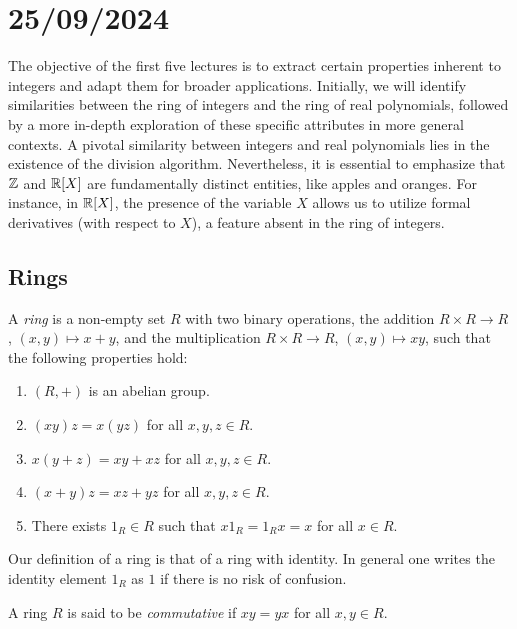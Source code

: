 \section{25/09/2024}

The objective of the first five lectures is to extract certain properties inherent to integers and adapt them for broader applications. Initially, we will identify similarities between the ring of integers and the ring of real polynomials, 
followed by a more in-depth exploration of these specific attributes in more general contexts. A pivotal similarity between integers and real polynomials lies in the existence of the division algorithm. Nevertheless, it is essential to emphasize that $\mathbb{Z}$ and $\mathbb{R}[X]$ are fundamentally distinct entities, like apples and oranges. For instance, in $\mathbb{R}[X]$, 
the presence of the variable $X$ allows us to utilize formal derivatives 
(with respect to $X$), a feature absent in the ring of integers. 

\subsection{Rings}

\begin{definition}
A \emph{ring} is a non-empty set $R$ with two binary operations, the addition
$R\times R\to R$, $(x,y)\mapsto x+y$, and the multiplication
$R\times R\to R$, $(x,y)\mapsto xy$, such that
the following properties hold:
\begin{enumerate}
    \item $(R,+)$ is an abelian group.
    \item $(xy)z=x(yz)$ for all $x,y,z\in R$.
    \item $x(y+z)=xy+xz$ for all $x,y,z\in R$.
    \item $(x+y)z=xz+yz$ for all $x,y,z\in R$.
    \item There exists $1_R\in R$ such that $x1_R=1_Rx=x$ for all $x\in R$.
\end{enumerate}
\end{definition}

Our definition of a ring is that of a ring with identity. In general one
writes the identity element $1_R$ as $1$ if there is no risk of confusion.

\begin{definition}
A ring $R$ is said to be \emph{commutative} if $xy=yx$ for all $x,y\in R$. 
\end{definition}

